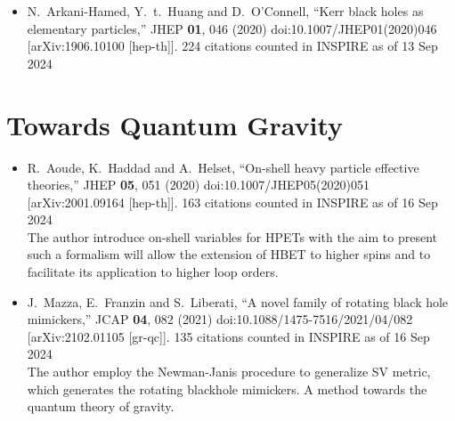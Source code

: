 \documentclass[a4paper,12pt]{article}
\title{}
\author{}
\begin{document}
    \begin{itemize}
        \item %
        N.~Arkani-Hamed, Y.~t.~Huang and D.~O'Connell,
        ``Kerr black holes as elementary particles,''
        JHEP \textbf{01}, 046 (2020)
        doi:10.1007/JHEP01(2020)046
        [arXiv:1906.10100 [hep-th]].
        224 citations counted in INSPIRE as of 13 Sep 2024
    \end{itemize}
\section*{Towards Quantum Gravity}
\begin{itemize}
    \item %
    R.~Aoude, K.~Haddad and A.~Helset,
    ``On-shell heavy particle effective theories,''
    JHEP \textbf{05}, 051 (2020)
    doi:10.1007/JHEP05(2020)051
    [arXiv:2001.09164 [hep-th]].
    163 citations counted in INSPIRE as of 16 Sep 2024\\
    The author introduce on-shell variables for HPETs with the aim to present such a formalism will allow the extension of
    HBET to higher spins and to facilitate its application to higher loop orders. 
    \item %
    J.~Mazza, E.~Franzin and S.~Liberati,
    ``A novel family of rotating black hole mimickers,''
    JCAP \textbf{04}, 082 (2021)
    doi:10.1088/1475-7516/2021/04/082
    [arXiv:2102.01105 [gr-qc]].
    135 citations counted in INSPIRE as of 16 Sep 2024\\
    The author employ the Newman-Janis procedure to generalize SV metric, which generates the rotating blackhole mimickers. A method towards the quantum theory of gravity.
\end{itemize}
\end{document}
